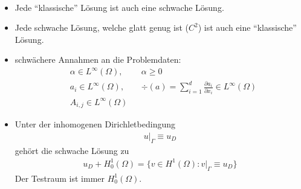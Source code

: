 \begin{bemerkung}\ %
\begin{itemize}
\item Jede ``klassische'' Lösung ist auch eine schwache Lösung. 
\item Jede schwache Lösung, welche glatt genug ist ($C^2$) ist auch eine ``klassische'' Lösung.
\item schwächere Annahmen an die Problemdaten:
\begin{align*}
	&\alpha\in L^\infty(\Omega), &&\alpha\geq0\\
	&a_i\in L^\infty(\Omega), &&\div(a)=\sum\limits_{i=1}^d\frac{\partial a_i}{\partial x_i}\in L^\infty(\Omega)\\
&A_{i,j}\in L^\infty(\Omega)
\end{align*}
\item Unter der inhomogenen Dirichletbedingung
\begin{align*}
u|_\Gamma\equiv u_D
\end{align*}
gehört die schwache Lösung zu
\begin{align*}
u_D+H_0^1(\Omega)=\big\lbrace v\in H^1(\Omega):v|_\Gamma\equiv u_D\big\rbrace
\end{align*}
Der Testraum ist immer $H^1_0(\Omega)$.
\end{itemize}
\end{bemerkung}

